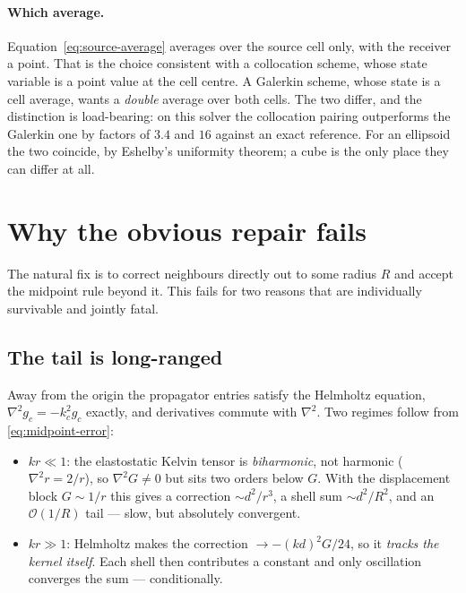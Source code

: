 \documentclass[11pt,a4paper]{article}
\newcommand{\order}{\mathcal{O}}
\begin{document}
\paragraph{Which average.}
Equation~\eqref{eq:source-average} averages over the source cell only, with the
receiver a point. That is the choice consistent with a collocation scheme, whose
state variable is a point value at the cell centre. A Galerkin scheme, whose
state is a cell average, wants a \emph{double} average over both cells. The two
differ, and the distinction is load-bearing: on this solver the collocation
pairing outperforms the Galerkin one by factors of $3.4$ and $16$ against an
exact reference. For an ellipsoid the two coincide, by Eshelby's uniformity
theorem; a cube is the only place they can differ at all.

\section{Why the obvious repair fails}

The natural fix is to correct neighbours directly out to some radius $R$ and
accept the midpoint rule beyond it. This fails for two reasons that are
individually survivable and jointly fatal.

\subsection{The tail is long-ranged}

Away from the origin the propagator entries satisfy the Helmholtz equation,
$\nabla^{2}g_c = -k_c^{2}g_c$ exactly, and derivatives commute with
$\nabla^{2}$. Two regimes follow from \eqref{eq:midpoint-error}:

\begin{itemize}[leftmargin=2em]
\item $kr \ll 1$: the elastostatic Kelvin tensor is \emph{biharmonic}, not
  harmonic ($\nabla^{2}r = 2/r$), so $\nabla^{2}G \neq 0$ but sits two orders
  below $G$. With the displacement block $G\sim1/r$ this gives a correction
  $\sim d^{2}/r^{3}$, a shell sum $\sim d^{2}/R^{2}$, and an $\order(1/R)$
  tail --- slow, but absolutely convergent.
\item $kr \gg 1$: Helmholtz makes the correction $\to -(kd)^{2}G/24$, so it
  \emph{tracks the kernel itself}. Each shell then contributes a constant and
  only oscillation converges the sum --- conditionally.
\end{itemize}
\end{document}
